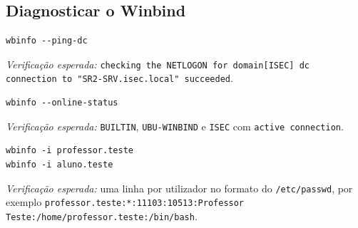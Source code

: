 
\subsection[Diagnosticar o Winbind]{Diagnosticar o Winbind}


\begin{lstlisting}[style=bashstyle]
wbinfo --ping-dc
\end{lstlisting}

\emph{Verificação esperada:} \texttt{checking the NETLOGON for domain[ISEC] dc connection to "SR2-SRV.isec.local" succeeded}.


\begin{lstlisting}[style=bashstyle]
wbinfo --online-status
\end{lstlisting}

\emph{Verificação esperada:} \texttt{BUILTIN}, \texttt{UBU-WINBIND} e \texttt{ISEC} com \texttt{active connection}.


\begin{lstlisting}[style=bashstyle]
wbinfo -i professor.teste
wbinfo -i aluno.teste
\end{lstlisting}

\emph{Verificação esperada:} uma linha por utilizador no formato do \texttt{/\allowbreak{}etc/\allowbreak{}passwd}, por exemplo \texttt{professor.teste:*:11103:10513:Professor Teste:/\allowbreak{}home/\allowbreak{}professor.teste:/\allowbreak{}bin/\allowbreak{}bash}.

